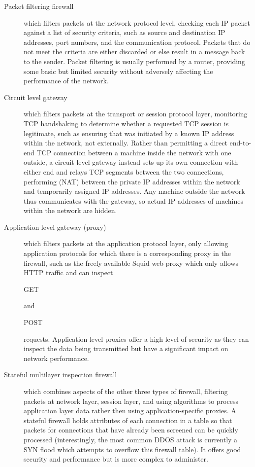 \begin{description}
  \item[Packet filtering firewall] which filters packets at the network protocol level,
  checking each IP packet against a list of security criteria, such as source and destination
  IP addresses, port numbers, and the communication protocol.
  Packets that do not meet the criteria are either discarded or else result in a message
  back to the sender.
  Packet filtering is usually performed by a router, providing some basic but limited
  security without adversely affecting the performance of the network.

  \item[Circuit level gateway] which filters packets at the transport or session protocol layer,
  monitoring TCP handshaking to determine whether a requested TCP session is legitimate,
  such as ensuring that was initiated by a known IP address within the network,
  not externally.
  Rather than permitting a direct end-to-end TCP connection between a machine inside
  the network with one outside, a circuit level gateway instead sets up its own connection
  with either end and relays TCP segments between the two connections,
  performing  (NAT) between the private IP addresses
  within the network and temporarily assigned IP addresses.
  Any machine outside the network thus communicates with the gateway, so
  actual IP addresses of machines within the network are hidden.

  \item[Application level gateway (proxy)] which filters packets at the application
  protocol layer, only allowing application protocols for which there is a corresponding
  proxy in the firewall, such as the freely available Squid web proxy which only
  allows HTTP traffic and can inspect \begin{code}GET\end{code} and
  \begin{code}POST\end{code} requests.
  Application level proxies offer a high level of security as they can inspect
  the data being transmitted but have a significant
  impact on network performance.

  \item[Stateful multilayer inspection firewall] which combines aspects
  of the other three types of firewall, filtering packets at network layer,
  session layer, and using algorithms to process application layer data
  rather then using application-specific proxies.
  A stateful firewall holds attributes of each connection in a table so that
  packets for connections that have already been screened can be quickly processed
  (interestingly, the most common DDOS attack is currently a SYN flood which
  attempts to overflow this firewall table).
  It offers good security and performance but is more complex to administer.
\end{description}

